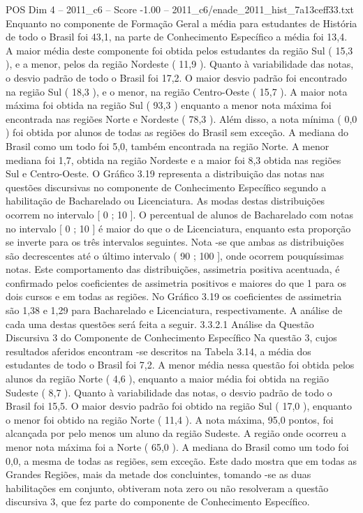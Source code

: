 \begin{textsample}{POS Dim 4 – 2011\_c6 – Score -1.00 – 2011\_c6/enade\_2011\_hist\_7a13ceff33.txt}
Enquanto no componente de Formação Geral a média para estudantes de História de todo o Brasil foi 43,1, na parte de Conhecimento Específico a média foi 13,4.
A maior média deste componente foi obtida pelos estudantes da região Sul ( 15,3 ), e a menor, pelos da região Nordeste ( 11,9 ).
Quanto à variabilidade das notas, o desvio padrão de todo o Brasil foi 17,2.
O maior desvio padrão foi encontrado na região Sul ( 18,3 ), e o menor, na região Centro-Oeste ( 15,7 ).
A maior nota máxima foi obtida na região Sul ( 93,3 ) enquanto a menor nota máxima foi encontrada nas regiões Norte e Nordeste ( 78,3 ).
Além disso, a nota mínima ( 0,0 ) foi obtida por alunos de todas as regiões do Brasil sem exceção.
A mediana do Brasil como um todo foi 5,0, também encontrada na região Norte.
A menor mediana foi 1,7, obtida na região Nordeste e a maior foi 8,3 obtida nas regiões Sul e Centro-Oeste.
O Gráfico 3.19 representa a distribuição das notas nas questões discursivas no componente de Conhecimento Específico segundo a habilitação de Bacharelado ou Licenciatura.
As modas destas distribuições ocorrem no intervalo [ 0 ; 10 ].
O percentual de alunos de Bacharelado com notas no intervalo [ 0 ; 10 ] é maior do que o de Licenciatura, enquanto esta proporção se inverte para os três intervalos seguintes.
Nota -se que ambas as distribuições são decrescentes até o último intervalo ( 90 ; 100 ], onde ocorrem pouquíssimas notas.
Este comportamento das distribuições, assimetria positiva acentuada, é confirmado pelos coeficientes de assimetria positivos e maiores do que 1 para os dois cursos e em todas as regiões.
No Gráfico 3.19 os coeficientes de assimetria são 1,38 e 1,29 para Bacharelado e Licenciatura, respectivamente.
A análise de cada uma destas questões será feita a seguir. 3.3.2.1 Análise da Questão Discursiva 3 do Componente de Conhecimento Específico Na questão 3, cujos resultados aferidos encontram -se descritos na Tabela 3.14, a média dos estudantes de todo o Brasil foi 7,2.
A menor média nessa questão foi obtida pelos alunos da região Norte ( 4,6 ), enquanto a maior média foi obtida na região Sudeste ( 8,7 ).
Quanto à variabilidade das notas, o desvio padrão de todo o Brasil foi 15,5.
O maior desvio padrão foi obtido na região Sul ( 17,0 ), enquanto o menor foi obtido na região Norte ( 11,4 ).
A nota máxima, 95,0 pontos, foi alcançada por pelo menos um aluno da região Sudeste.
A região onde ocorreu a menor nota máxima foi a Norte ( 65,0 ).
A mediana do Brasil como um todo foi 0,0, a mesma de todas as regiões, sem exceção.
Este dado mostra que em todas as Grandes Regiões, mais da metade dos concluintes, tomando -se as duas habilitações em conjunto, obtiveram nota zero ou não resolveram a questão discursiva 3, que fez parte do componente de Conhecimento Específico.

\end{textsample}
